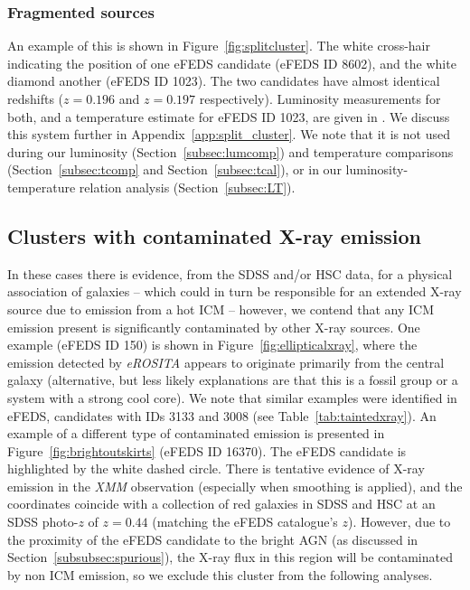 \documentclass[fleqn,usenatbib]{mnras}
\begin{document}
\subsubsection{Fragmented sources}
\label{subsubsec:frag}

An example of this is shown in Figure~\ref{fig:splitcluster}. The white cross-hair indicating the position of one eFEDS candidate (eFEDS ID 8602), and the white diamond another (eFEDS ID 1023). The two candidates have almost identical redshifts ($z{=}0.196$ and $z{=}0.197$ respectively). Luminosity measurements for both, and a temperature estimate for eFEDS ID 1023, are given in \cite{efedsclustercat}. We discuss this system further in Appendix~\ref{app:split_cluster}. We note that it is not used during our luminosity (Section~\ref{subsec:lumcomp}) and temperature comparisons (Section~\ref{subsec:tcomp} and Section~\ref{subsec:tcal}), or in our luminosity-temperature relation analysis (Section~\ref{subsec:LT}).

\subsection{Clusters with contaminated X-ray emission}
\label{subsec:contamxray}

In these cases there is evidence, from the SDSS and/or HSC data, for a physical association of galaxies -- which could in turn be responsible for an extended X-ray source due to  emission from a hot ICM  -- however, we contend that any ICM emission present is significantly contaminated by other X-ray sources. 
One example (eFEDS ID 150) is shown in Figure~\ref{fig:ellipticalxray}, where the emission detected by {\em eROSITA} appears to originate primarily from the central galaxy (alternative, but less likely explanations are that this is a fossil group or a system with a strong cool core). We note that similar examples were identified in eFEDS, candidates with IDs 3133 and 3008 (see Table~\ref{tab:taintedxray}).
An example of a different type of contaminated emission is presented in Figure~\ref{fig:brightoutskirts} (eFEDS ID 16370). The eFEDS candidate is highlighted by the white dashed circle. There is tentative evidence of X-ray emission in the {\em XMM} observation (especially when smoothing is applied), and the coordinates coincide with a collection of red galaxies in SDSS and HSC at an SDSS photo-$z$ of $z{=}0.44$ (matching the eFEDS catalogue's $z$). However, due to the proximity of the eFEDS candidate to the bright AGN (as discussed in Section~\ref{subsubsec:spurious}), the X-ray flux in this region will be contaminated by non ICM emission, so we exclude this cluster from the following analyses.
\end{document}
